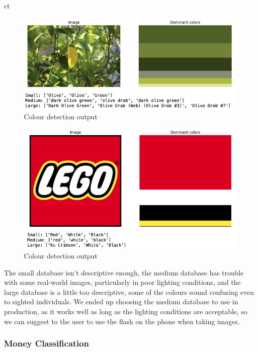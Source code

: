 ct\documentclass[a4paper,11pt]{article}
\begin{document}
\begin{figure}[H]
\centering
\includegraphics[scale=0.6]{img/cv/colour_detection/colour_detection_3.png}
\caption{Colour detection output}
\label{fig:color-detection-output-3}
\end{figure}


\begin{figure}[H]
\centering
\includegraphics[scale=0.6]{img/cv/colour_detection/colour_detection_4.png}
\caption{Colour detection output}
\label{fig:color-detection-output-4}
\end{figure}

The small database isn't descriptive enough, the medium database has trouble with some real-world images, particularly in poor lighting conditions, and the large database is a little too descriptive, some of the colours sound confusing even to sighted individuals. We ended up choosing the medium database to use in production, as it works well as long as the lighting conditions are acceptable, so we can suggest to the user to use the flash on the phone when taking images.


\subsubsection{Money Classification}
\end{document}
